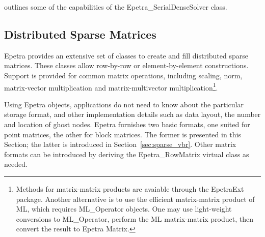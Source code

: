  outlines some of the capabilities of the
Epetra\_SerialDenseSolver class.


\subsection{Distributed Sparse Matrices}
\label{sec:sparse_mat}

Epetra provides an extensive set of classes to create and fill
distributed sparse matrices. These classes allow row-by-row or
element-by-element constructions. Support is provided for common matrix
operations, including scaling, norm, matrix-vector multiplication and
matrix-multivector multiplication\footnote{Methods for matrix-matrix
  products are avaiable through the EpetraExt package. Another
  alternative is to use the efficient matrix-matrix product of ML, which
  requires ML\_Operator objects. One may use light-weight conversions to
  ML\_Operator, perform the ML matrix-matrix product, then convert the
  result to Epetra Matrix.}.

Using Epetra objects, applications do not need to know about the
particular storage format, and other implementation details such as data
layout, the number and location of ghost nodes. Epetra furnishes two
basic formats, one suited for point matrices, the other for block
matrices.  The former is presented in this Section; the latter is
introduced in Section~\ref{sec:sparse_vbr}. Other matrix formats can be
introduced by deriving the Epetra\_RowMatrix virtual class as needed.

